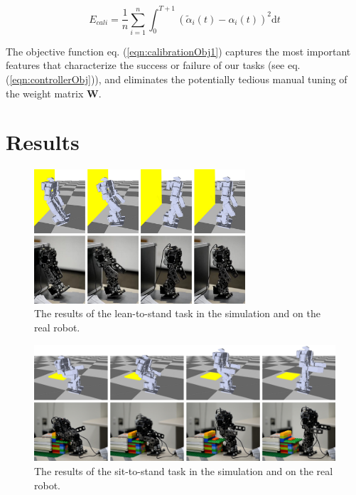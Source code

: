 \begin{equation}
  E_{cali}=\frac{1}{n}\sum_{i=1}^{n}\int_{0}^{T+1}(\tilde{\alpha}_i(t)-\alpha_i(t))^2\mathrm{d}t
  \label{eqn:calibrationObj1}
\end{equation}

The objective function eq. (\ref{eqn:calibrationObj1}) captures the most important features that characterize the success or failure of our tasks (see eq.(\ref{eqn:controllerObj})), and eliminates the potentially tedious manual tuning of the weight matrix $\mathbf{W}$.





\section{Results}

\begin{figure}[!t]
  \centering
  \includegraphics[width=0.7\textwidth]{figures/lean2Stand}
  \caption{The results of the lean-to-stand task in the simulation and on the real robot.}
  \label{fig:lean2Stand}
\end{figure}

\begin{figure}[!t]
  \centering
  \includegraphics[width=\textwidth]{figures/sit2Stand}
  \caption{The results of the sit-to-stand task in the simulation and on the real robot.}
  \label{fig:lean2Stand}
\end{figure}

